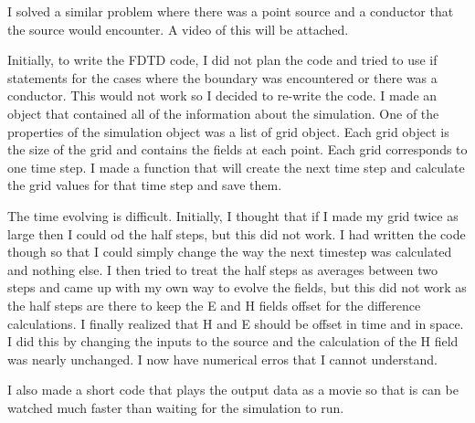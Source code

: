 
I solved a similar problem where there was a point source and a conductor that the source would encounter. A video of this will be attached. 


Initially, to write the FDTD code, I did not plan the code and tried to use if statements for the cases where the boundary was encountered or there was a conductor. This would not work so I decided to re-write the code. I made an object that contained all of the information about the simulation. One of the properties of the simulation object was a list of grid object. Each grid object is the size of the grid and contains the fields at each point. Each grid corresponds to one time step. I made a function that will create the next time step and calculate the grid values for that time step and save them. 

The time evolving is difficult. Initially, I thought that if I made my grid twice as large then I could od the half steps, but this did not work. I had written the code though so that I could simply change the way the next timestep was calculated and nothing else. I then tried to treat the half steps as averages between two steps and came up with my own way to evolve the fields, but this did not work as the half steps are there to keep the E and H fields offset for the difference calculations. I finally realized that H and E should be offset in time and in space. I did this by changing the inputs to the source and the calculation of the H field was nearly unchanged. I now have numerical erros that I cannot understand.

I also made a short code that plays the output data as a movie so that is can be watched much faster than waiting for the simulation to run.